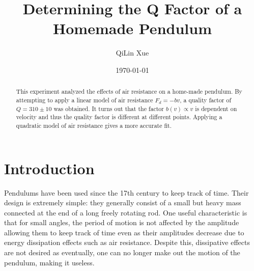 \documentclass[%
 reprint,
 amsmath,amssymb
 aps,
]{revtex4-2}
\begin{document}

\title{Determining the Q Factor of a Homemade Pendulum}%

\author{QiLin Xue}

\date{\today}%

\begin{abstract}
This experiment analyzed the effects of air resistance on a home-made pendulum. By attempting to apply a linear model of air resistance $F_d=-bv$, a quality factor of $Q=310 \pm 10$ was obtained. It turns out that the factor $b(v) \propto v$ is dependent on velocity and thus the quality factor is different at different points. Applying a quadratic model of air resistance gives a more accurate fit.
\end{abstract}

\maketitle

\section{Introduction}

Pendulums have been used since the 17th century to keep track of time.\cite{pendulum} Their design is extremely simple: they generally consist of a small but heavy mass connected at the end of a long freely rotating rod. One useful characteristic is that for small angles, the period of motion is not affected by the amplitude allowing them to keep track of time even as their amplitudes decrease due to energy dissipation effects such as air resistance. Despite this, dissipative effects are not desired as eventually, one can no longer make out the motion of the pendulum, making it useless.  
\end{document}
